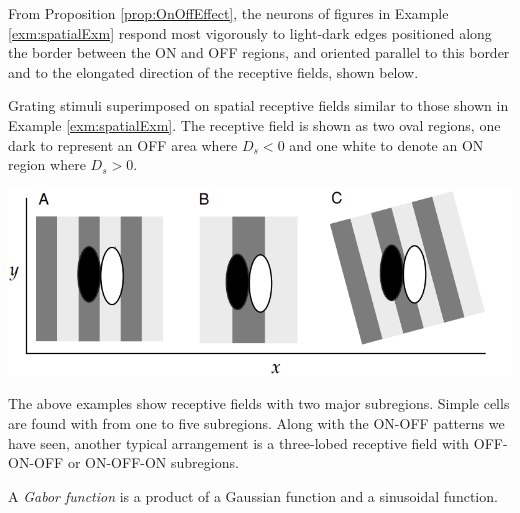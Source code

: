 \begin{rem}
  From Proposition \ref{prop:OnOffEffect}, the neurons of figures in Example \ref{exm:spatialExm} respond most vigorously to light-dark edges positioned along the border between the ON and OFF regions, and oriented parallel to this border and to the elongated direction of the receptive fields, shown below.
\end{rem}

\begin{exm}
  \label{exm:spatialStimuliExm}
  Grating stimuli superimposed on spatial receptive fields similar to those shown in Example \ref{exm:spatialExm}.  The receptive field is shown as two oval regions, one dark to represent an OFF area where $D_s<0$ and one white to denote an ON region
where $D_s>0$.
  \begin{center}
    \includegraphics[scale=0.3]{./png/spatial_stimuliExm}
  \end{center}
\end{exm}

\begin{rem}
  The above examples show receptive fields with two major subregions. Simple cells are found with from one to five subregions. Along with the ON-OFF patterns we have seen, another typical arrangement is a three-lobed receptive field with OFF-ON-OFF or ON-OFF-ON subregions.
\end{rem}

\begin{defn}
  \label{def:GaborFunc}
  A \emph{Gabor function} is a product of a Gaussian function and a sinusoidal function.
\end{defn}

